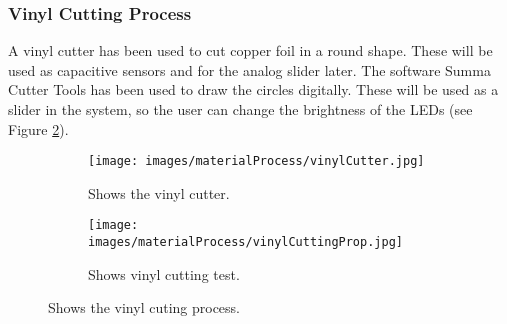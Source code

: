 \documentclass[04.3_buildingProcess.tex]{subfiles}
\begin{document}
    \subsubsection{Vinyl Cutting Process}
    \begin{flushleft}
        \noindent
        A vinyl cutter \cite{vinylCutter} has been used to cut copper foil in a 
        round shape. These will be used as capacitive sensors and for the analog slider later. 
        The software Summa Cutter Tools \cite{SoftwareSumma} has been used to draw the circles 
        digitally. These will be used as a slider in the system, so the user can change the 
        brightness of the LEDs (see Figure \ref{fig:vinylCuttingProp}).

        \begin{figure}[H]
            \centering
            \begin{subfigure}{.45\textwidth}
                \centering
                \texttt{[image: images/materialProcess/vinylCutter.jpg]}
                \caption{Shows the vinyl cutter.}
                \label{fig:vinylCutter}
                \vspace{6mm}
            \end{subfigure}
            \medskip
            \hspace{1mm}
            \begin{subfigure}{.45\textwidth}
                \centering
                \texttt{[image: images/materialProcess/vinylCuttingProp.jpg]}
                \caption{Shows vinyl cutting test.}
                \label{fig:vinylCuttingProp}
                \vspace{6mm}
            \end{subfigure}
            \caption{Shows the vinyl cuting process.}
            \label{fig:laserCutTests}
        \end{figure}
    \end{flushleft}
\end{document}

